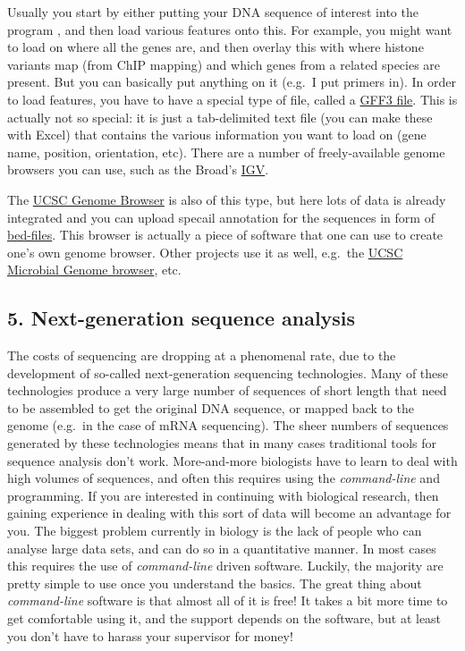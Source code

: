 \documentclass[]{article}
\begin{document}
Usually you start by either putting your DNA sequence of interest into
the program , and then load various features onto this. For example, you
might want to load on where all the genes are, and then overlay this
with where histone variants map (from ChIP mapping) and which genes from
a related species are present. But you can basically put anything on it
(e.g.~I put primers in). In order to load features, you have to have a
special type of file, called a
\href{http://compbio.massey.ac.nz/wiki/\#!bioinf_files.md}{GFF3 file}.
This is actually not so special: it is just a tab-delimited text file
(you can make these with Excel) that contains the various information
you want to load on (gene name, position, orientation, etc). There are a
number of freely-available genome browsers you can use, such as the
Broad's \href{https://www.broadinstitute.org/igv/home}{IGV}.

The \href{http://genome.ucsc.edu/}{UCSC Genome Browser} is also of this
type, but here lots of data is already integrated and you can upload
specail annotation for the sequences in form of
\href{http://compbio.massey.ac.nz/wiki/\#!bioinf_files.md}{bed-files}.
This browser is actually a piece of software that one can use to create
one's own genome browser. Other projects use it as well, e.g.~the
\href{http://microbes.ucsc.edu/}{UCSC Microbial Genome browser}, etc.

\subsection{5. Next-generation sequence
analysis}\label{next-generation-sequence-analysis}

The costs of sequencing are dropping at a phenomenal rate, due to the
development of so-called next-generation sequencing technologies. Many
of these technologies produce a very large number of sequences of short
length that need to be assembled to get the original DNA sequence, or
mapped back to the genome (e.g.~in the case of mRNA sequencing). The
sheer numbers of sequences generated by these technologies means that in
many cases traditional tools for sequence analysis don't work.
More-and-more biologists have to learn to deal with high volumes of
sequences, and often this requires using the \emph{command-line} and
programming. If you are interested in continuing with biological
research, then gaining experience in dealing with this sort of data will
become an advantage for you. The biggest problem currently in biology is
the lack of people who can analyse large data sets, and can do so in a
quantitative manner. In most cases this requires the use of
\emph{command-line} driven software. Luckily, the majority are pretty
simple to use once you understand the basics. The great thing about
\emph{command-line} software is that almost all of it is free! It takes
a bit more time to get comfortable using it, and the support depends on
the software, but at least you don't have to harass your supervisor for
money!
\end{document}
